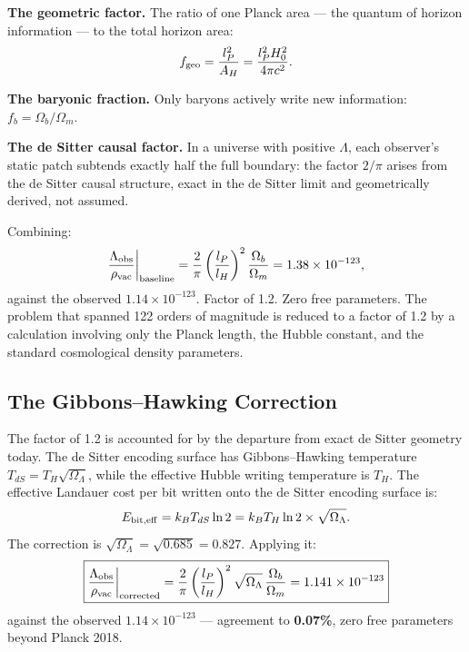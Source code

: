 \documentclass[12pt,a4paper]{article}
\begin{document}
\textbf{The geometric factor.} The ratio of one Planck area --- the quantum of
horizon information --- to the total horizon area:
\begin{equation}
f_{\rm geo} = \frac{l_P^2}{A_H} = \frac{l_P^2 H_0^2}{4\pi c^2}.
\end{equation}

\textbf{The baryonic fraction.} Only baryons actively write new information:
$f_b = \Omega_b/\Omega_m$.

\textbf{The de Sitter causal factor.} In a universe with positive $\Lambda$,
each observer's static patch subtends exactly half the full boundary: the factor
$2/\pi$ arises from the de Sitter causal structure, exact in the de Sitter
limit and geometrically derived, not assumed.

Combining:
\begin{equation}
\frac{\Lambda_{\rm obs}}{\rho_{\rm vac}}\bigg|_{\rm baseline}
= \frac{2}{\pi}\left(\frac{l_P}{l_H}\right)^2\frac{\Omega_b}{\Omega_m}
= 1.38 \times 10^{-123},
\end{equation}
against the observed $1.14 \times 10^{-123}$. Factor of 1.2. Zero free
parameters. The problem that spanned 122 orders of magnitude is reduced to
a factor of 1.2 by a calculation involving only the Planck length, the Hubble
constant, and the standard cosmological density parameters.

\subsection{The Gibbons--Hawking Correction}

The factor of 1.2 is accounted for by the departure from exact de Sitter
geometry today. The de Sitter encoding surface has Gibbons--Hawking temperature
$T_{dS} = T_H\sqrt{\Omega_\Lambda}$, while the effective Hubble writing
temperature is $T_H$. The effective Landauer cost per bit written onto the de
Sitter encoding surface is:
\begin{equation}
E_{\rm bit,eff} = k_B T_{dS} \ln 2 = k_B T_H \ln 2 \times \sqrt{\Omega_\Lambda}.
\end{equation}
The correction is $\sqrt{\Omega_\Lambda} = \sqrt{0.685} = 0.827$. Applying it:
\begin{equation}
\boxed{\frac{\Lambda_{\rm obs}}{\rho_{\rm vac}}\bigg|_{\rm corrected}
= \frac{2}{\pi}\left(\frac{l_P}{l_H}\right)^2
\sqrt{\Omega_\Lambda}\,\frac{\Omega_b}{\Omega_m}
= 1.141 \times 10^{-123}}
\end{equation}
against the observed $1.14 \times 10^{-123}$ --- agreement to \textbf{0.07\%},
zero free parameters beyond Planck 2018.
\end{document}

